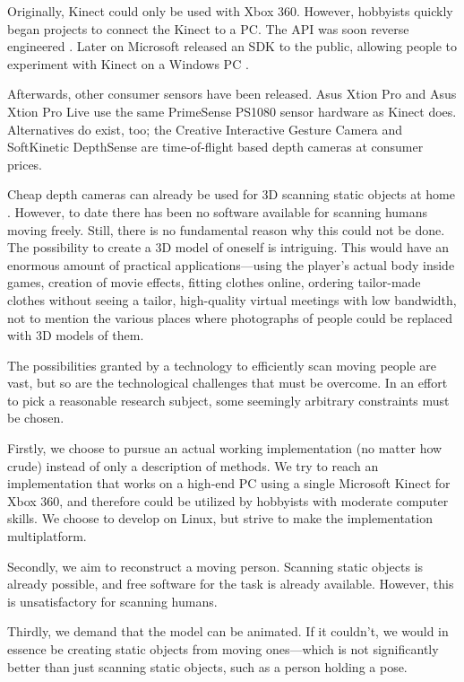 Originally, Kinect could only be used with Xbox 360. However, hobbyists quickly began projects to connect the Kinect to a PC. The API was soon reverse engineered \citep{openkinect}. Later on Microsoft released an SDK to the public, allowing people to experiment with Kinect on a Windows PC \citep{KinectSDK}.

Afterwards, other consumer sensors have been released. Asus Xtion Pro and Asus Xtion Pro Live use the same PrimeSense PS1080 sensor hardware as Kinect does. Alternatives do exist, too; the Creative Interactive Gesture Camera and SoftKinetic DepthSense are time-of-flight based depth cameras at consumer prices.

Cheap depth cameras can already be used for 3D scanning static objects at home \autocites{newcombe2011kinectfusion}{izadi2011kinectfusion}. However, to date there has been no software available for scanning humans moving freely. Still, there is no fundamental reason why this could not be done. The possibility to create a 3D model of oneself is intriguing. This would have an enormous amount of practical applications---using the player's actual body inside games, creation of movie effects, fitting clothes online, ordering tailor-made clothes without seeing a tailor, high-quality virtual meetings with low bandwidth, not to mention the various places where photographs of people could be replaced with 3D models of them.

The possibilities granted by a technology to efficiently scan moving people are vast, but so are the technological challenges that must be overcome. In an effort to pick a reasonable research subject, some seemingly arbitrary constraints must be chosen.

Firstly, we choose to pursue an actual working implementation (no matter how crude) instead of only a description of methods. We try to reach an implementation that works on a high-end PC using a single Microsoft Kinect for Xbox 360, and therefore could be utilized by hobbyists with moderate computer skills. We choose to develop on Linux, but strive to make the implementation multiplatform.

Secondly, we aim to reconstruct a moving person. Scanning static objects is already possible, and free software for the task is already available. However, this is unsatisfactory for scanning humans.

Thirdly, we demand that the model can be animated. If it couldn't, we would in essence be creating static objects from moving ones---which is not significantly better than just scanning static objects, such as a person holding a pose.

